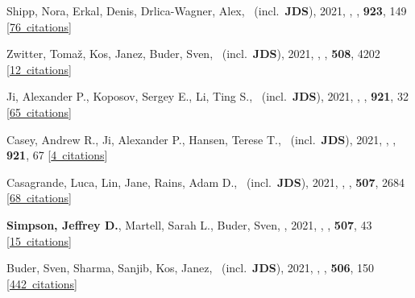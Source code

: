 \item[{\color{numcolor}\scriptsize67}] Shipp, Nora, Erkal, Denis, Drlica-Wagner, Alex, \etal\ (incl.\ \textbf{JDS}), 2021, , \apj, \textbf{923}, 149 [\href{https://ui.adsabs.harvard.edu/#abs/2021ApJ...923..149S}{76~citations}]

\item[{\color{numcolor}\scriptsize66}] Zwitter, Toma{\v{z}}, Kos, Janez, Buder, Sven, \etal\ (incl.\ \textbf{JDS}), 2021, , \mnras, \textbf{508}, 4202 [\href{https://ui.adsabs.harvard.edu/#abs/2021MNRAS.508.4202Z}{12~citations}]

\item[{\color{numcolor}\scriptsize65}] Ji, Alexander P., Koposov, Sergey E., Li, Ting S., \etal\ (incl.\ \textbf{JDS}), 2021, , \apj, \textbf{921}, 32 [\href{https://ui.adsabs.harvard.edu/#abs/2021ApJ...921...32J}{65~citations}]

\item[{\color{numcolor}\scriptsize64}] Casey, Andrew R., Ji, Alexander P., Hansen, Terese T., \etal\ (incl.\ \textbf{JDS}), 2021, , \apj, \textbf{921}, 67 [\href{https://ui.adsabs.harvard.edu/#abs/2021ApJ...921...67C}{4~citations}]

\item[{\color{numcolor}\scriptsize63}] Casagrande, Luca, Lin, Jane, Rains, Adam D., \etal\ (incl.\ \textbf{JDS}), 2021, , \mnras, \textbf{507}, 2684 [\href{https://ui.adsabs.harvard.edu/#abs/2021MNRAS.507.2684C}{68~citations}]

\item[{\color{numcolor}\scriptsize62}] \textbf{Simpson, Jeffrey D.}, Martell, Sarah L., Buder, Sven, \etal, 2021, , \mnras, \textbf{507}, 43 [\href{https://ui.adsabs.harvard.edu/#abs/2021MNRAS.507...43S}{15~citations}]

\item[{\color{numcolor}\scriptsize61}] Buder, Sven, Sharma, Sanjib, Kos, Janez, \etal\ (incl.\ \textbf{JDS}), 2021, , \mnras, \textbf{506}, 150 [\href{https://ui.adsabs.harvard.edu/#abs/2021MNRAS.506..150B}{442~citations}]

